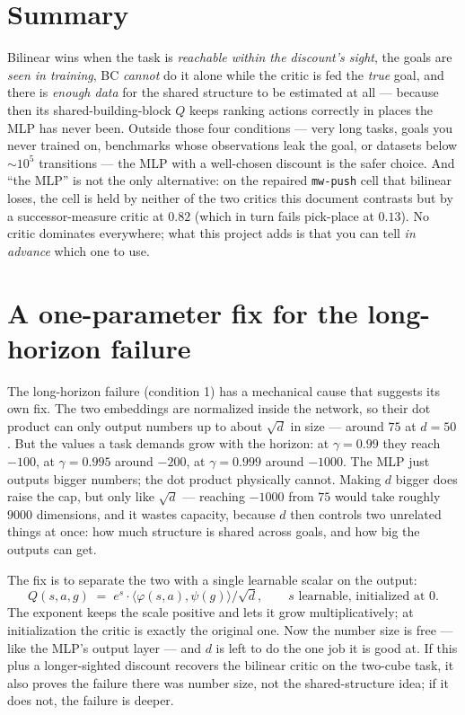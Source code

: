 \documentclass[10pt]{article}
\begin{document}
\section{Summary}

Bilinear wins when the task is \emph{reachable within the discount's sight}, the goals
are \emph{seen in training}, BC \emph{cannot} do it alone while the critic is fed the
\emph{true} goal, and there is \emph{enough data} for the shared structure to be
estimated at all --- because then its shared-building-block $Q$ keeps ranking actions
correctly in places the MLP has never been. Outside those four conditions --- very long
tasks, goals you never trained on, benchmarks whose observations leak the goal, or
datasets below ${\sim}10^5$ transitions --- the MLP with a well-chosen discount is the
safer choice. And ``the MLP'' is not the only alternative: on the repaired
\texttt{mw-push} cell that bilinear loses, the cell is held by neither of the two critics
this document contrasts but by a successor-measure critic at $0.82$ (which in turn fails
pick-place at $0.13$). No critic dominates everywhere; what this project adds is that you
can tell \emph{in advance} which one to use.

\section{A one-parameter fix for the long-horizon failure}

The long-horizon failure (condition 1) has a mechanical cause that suggests its own fix.
The two embeddings are normalized inside the network, so their dot product can only
output numbers up to about $\sqrt d$ in size --- around $75$ at $d{=}50$. But the values
a task demands grow with the horizon: at $\gamma=0.99$ they reach $-100$, at
$\gamma=0.995$ around $-200$, at $\gamma=0.999$ around $-1000$. The MLP just outputs
bigger numbers; the dot product physically cannot. Making $d$ bigger does raise the cap,
but only like $\sqrt d$ --- reaching $-1000$ from $75$ would take roughly $9000$
dimensions, and it wastes capacity, because $d$ then controls two unrelated things at
once: how much structure is shared across goals, and how big the outputs can get.

The fix is to separate the two with a single learnable scalar on the output:
\[
Q(s,a,g) \;=\; e^{s}\cdot \langle \varphi(s,a), \psi(g)\rangle/\sqrt d,
\qquad s \text{ learnable, initialized at } 0 .
\]
The exponent keeps the scale positive and lets it grow multiplicatively; at
initialization the critic is exactly the original one. Now the number size is free ---
like the MLP's output layer --- and $d$ is left to do the one job it is good at. If this
plus a longer-sighted discount recovers the bilinear critic on the two-cube task, it also
proves the failure there was number size, not the shared-structure idea; if it does not,
the failure is deeper.
\end{document}
